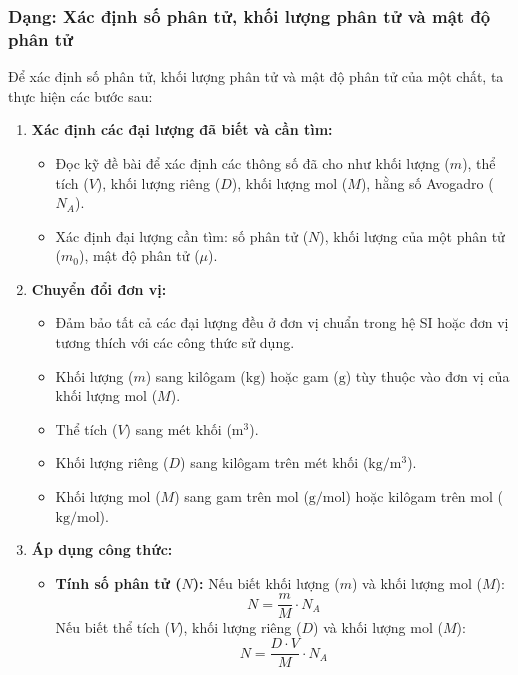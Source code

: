 \subsubsection{Dạng: Xác định số phân tử, khối lượng phân tử và mật độ phân tử}
\begin{phuongphap}
Để xác định số phân tử, khối lượng phân tử và mật độ phân tử của một chất, ta thực hiện các bước sau:
\begin{enumerate}
    \item \textbf{Xác định các đại lượng đã biết và cần tìm:}
    \begin{itemize}
        \item Đọc kỹ đề bài để xác định các thông số đã cho như khối lượng ($m$), thể tích ($V$), khối lượng riêng ($D$), khối lượng mol ($M$), hằng số Avogadro ($N_A$).
        \item Xác định đại lượng cần tìm: số phân tử ($N$), khối lượng của một phân tử ($m_0$), mật độ phân tử ($\mu$).
    \end{itemize}
    \item \textbf{Chuyển đổi đơn vị:}
    \begin{itemize}
        \item Đảm bảo tất cả các đại lượng đều ở đơn vị chuẩn trong hệ SI hoặc đơn vị tương thích với các công thức sử dụng.
        \item Khối lượng ($m$) sang kilôgam ($\mathrm{kg}$) hoặc gam ($\mathrm{g}$) tùy thuộc vào đơn vị của khối lượng mol ($M$).
        \item Thể tích ($V$) sang mét khối ($\mathrm{m^3}$).
        \item Khối lượng riêng ($D$) sang kilôgam trên mét khối ($\mathrm{kg/m^3}$).
        \item Khối lượng mol ($M$) sang gam trên mol ($\mathrm{g/mol}$) hoặc kilôgam trên mol ($\mathrm{kg/mol}$).
    \end{itemize}
    \item \textbf{Áp dụng công thức:}
    \begin{itemize}
        \item \textbf{Tính số phân tử ($N$):}
        Nếu biết khối lượng ($m$) và khối lượng mol ($M$):
        \begin{equation}
            N = \dfrac{m}{M} \cdot N_A
        \end{equation}
        Nếu biết thể tích ($V$), khối lượng riêng ($D$) và khối lượng mol ($M$):
        \begin{equation}
            N = \dfrac{D \cdot V}{M} \cdot N_A

\end{equation}
\end{itemize}
\end{enumerate}
\end{phuongphap}
